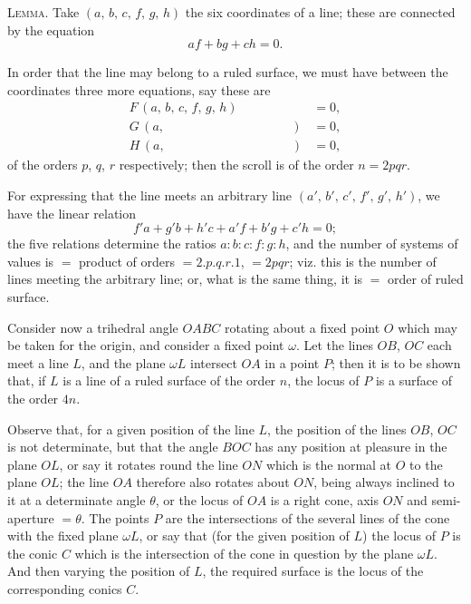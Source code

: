 \documentclass[11pt,a4paper]{book}
\begin{document}
\textsc{Lemma.} Take $(a,\,b,\,c,\,f,\,g,\,h)$ the six coordinates of a line; these are connected by the equation
\[
af + bg + ch = 0.
\]

In order that the line may belong to a ruled surface, we must have between the coordinates three more equations, say these are
\begin{align*}
F\,(a,\,b,\,c,\,f,\,g,\,h) &= 0,\\
G\,(a,\quad \,\phantom{b,}\,\quad \,\phantom{c,}\,\quad \,\phantom{f,}\,\quad \,\phantom{g,}\,\quad) &= 0,\\
H\,(a,\quad \,\phantom{b,}\,\quad \,\phantom{c,}\,\quad \,\phantom{f,}\,\quad \,\phantom{g,}\,\quad) &= 0,
\end{align*}
of the orders $p$, $q$, $r$ respectively; then the scroll is of the order $n = 2pqr$.

For expressing that the line meets an arbitrary line $(a',\,b',\,c',\,f',\,g',\,h')$, we have the linear relation
\[
f'a + g'b + h'c + a'f + b'g + c'h = 0;
\]
the five relations determine the ratios $a:b:c:f:g:h$, and the number of systems of values is $=$ product of orders $= 2. p. q. r. 1$, $= 2pqr$; viz. this is the number of lines meeting the arbitrary line; or, what is the same thing, it is $=$ order of ruled surface.

Consider now a trihedral angle $OABC$ rotating about a fixed point $O$ which may be taken for the origin, and consider a fixed point $\omega$. Let the lines $OB$, $OC$ each meet a line $L$, and the plane $\omega L$ intersect $OA$ in a point $P$; then it is to be shown that, if $L$ is a line of a ruled surface of the order $n$, the locus of $P$ is a surface of the order $4n$.

Observe that, for a given position of the line $L$, the position of the lines $OB$, $OC$ is not determinate, but that the angle $BOC$ has any position at pleasure in the plane $OL$, or say it rotates round the line $ON$ which is the normal at $O$ to the plane $OL$; the line $OA$ therefore also rotates about $ON$, being always inclined to it at a determinate angle $\theta$, or the locus of $OA$ is a right cone, axis $ON$ and semi-aperture $=\theta$. The points $P$ are the intersections of the several lines of the cone with the fixed plane $\omega L$, or say that (for the given position of $L$) the locus of $P$ is the conic $C$ which is the intersection of the cone in question by the plane $\omega L$. And then varying the position of $L$, the required surface is the locus of the corresponding conics $C$.
\end{document}
